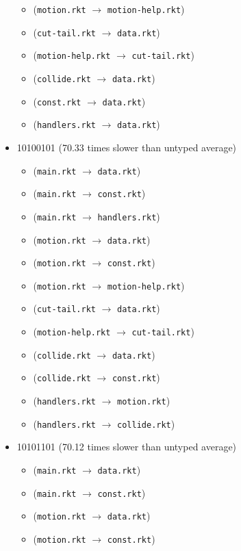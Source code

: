 \documentclass{article}
\newcommand{\mono}[1]{\texttt{#1}}
\begin{document}
\begin{itemize}
\begin{itemize}
  \item (\mono{motion.rkt} $\rightarrow$ \mono{motion-help.rkt})
  \item (\mono{cut-tail.rkt} $\rightarrow$ \mono{data.rkt})
  \item (\mono{motion-help.rkt} $\rightarrow$ \mono{cut-tail.rkt})
  \item (\mono{collide.rkt} $\rightarrow$ \mono{data.rkt})
  \item (\mono{const.rkt} $\rightarrow$ \mono{data.rkt})
  \item (\mono{handlers.rkt} $\rightarrow$ \mono{data.rkt})
  \end{itemize}
\item 10100101 (70.33 times slower than untyped average)
  \begin{itemize}
  \item (\mono{main.rkt} $\rightarrow$ \mono{data.rkt})
  \item (\mono{main.rkt} $\rightarrow$ \mono{const.rkt})
  \item (\mono{main.rkt} $\rightarrow$ \mono{handlers.rkt})
  \item (\mono{motion.rkt} $\rightarrow$ \mono{data.rkt})
  \item (\mono{motion.rkt} $\rightarrow$ \mono{const.rkt})
  \item (\mono{motion.rkt} $\rightarrow$ \mono{motion-help.rkt})
  \item (\mono{cut-tail.rkt} $\rightarrow$ \mono{data.rkt})
  \item (\mono{motion-help.rkt} $\rightarrow$ \mono{cut-tail.rkt})
  \item (\mono{collide.rkt} $\rightarrow$ \mono{data.rkt})
  \item (\mono{collide.rkt} $\rightarrow$ \mono{const.rkt})
  \item (\mono{handlers.rkt} $\rightarrow$ \mono{motion.rkt})
  \item (\mono{handlers.rkt} $\rightarrow$ \mono{collide.rkt})
  \end{itemize}
\item 10101101 (70.12 times slower than untyped average)
  \begin{itemize}
  \item (\mono{main.rkt} $\rightarrow$ \mono{data.rkt})
  \item (\mono{main.rkt} $\rightarrow$ \mono{const.rkt})
  \item (\mono{motion.rkt} $\rightarrow$ \mono{data.rkt})
  \item (\mono{motion.rkt} $\rightarrow$ \mono{const.rkt})

\end{itemize}
\end{itemize}
\end{document}
